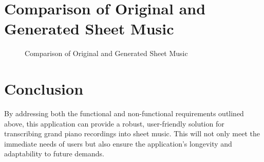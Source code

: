 \documentclass{article}
\begin{document}
\section{Comparison of Original and Generated Sheet Music}
\begin{figure}[h!]
    \centering
    \caption{Comparison of Original and Generated Sheet Music}
    \label{fig:comparison_sheet_music}
\end{figure}

\section{Conclusion}
By addressing both the functional and non-functional requirements outlined above, this application can provide a robust, user-friendly solution for transcribing grand piano recordings into sheet music. This will not only meet the immediate needs of users but also ensure the application's longevity and adaptability to future demands.
\end{document}
